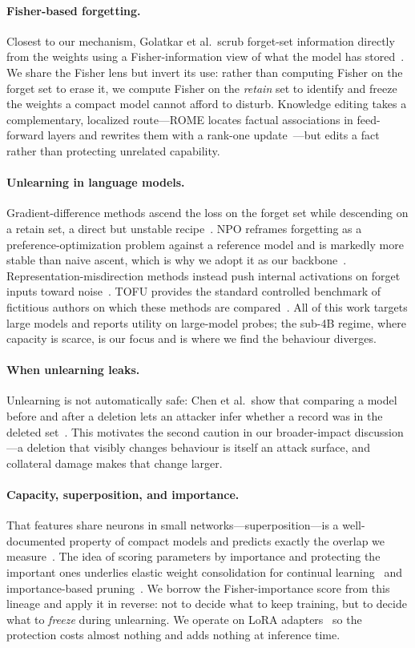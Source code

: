 \documentclass[sigconf,nonacm]{acmart}
\begin{document}
\paragraph{Fisher-based forgetting.}
Closest to our mechanism, Golatkar et al.\ scrub forget-set information directly from the weights using a Fisher-information view of what the model has stored~\cite{golatkar}. We share the Fisher lens but invert its use: rather than computing Fisher on the forget set to erase it, we compute Fisher on the \emph{retain} set to identify and freeze the weights a compact model cannot afford to disturb. Knowledge editing takes a complementary, localized route---ROME locates factual associations in feed-forward layers and rewrites them with a rank-one update~\cite{rome}---but edits a fact rather than protecting unrelated capability.

\paragraph{Unlearning in language models.}
Gradient-difference methods ascend the loss on the forget set while descending on a retain set, a direct but unstable recipe~\cite{yao2023}. NPO reframes forgetting as a preference-optimization problem against a reference model and is markedly more stable than naive ascent, which is why we adopt it as our backbone~\cite{npo}. Representation-misdirection methods instead push internal activations on forget inputs toward noise~\cite{wmdp}. TOFU provides the standard controlled benchmark of fictitious authors on which these methods are compared~\cite{tofu}. All of this work targets large models and reports utility on large-model probes; the sub-4B regime, where capacity is scarce, is our focus and is where we find the behaviour diverges.

\paragraph{When unlearning leaks.}
Unlearning is not automatically safe: Chen et al.\ show that comparing a model before and after a deletion lets an attacker infer whether a record was in the deleted set~\cite{chen2021}. This motivates the second caution in our broader-impact discussion---a deletion that visibly changes behaviour is itself an attack surface, and collateral damage makes that change larger.

\paragraph{Capacity, superposition, and importance.}
That features share neurons in small networks---superposition---is a well-documented property of compact models and predicts exactly the overlap we measure~\cite{superposition}. The idea of scoring parameters by importance and protecting the important ones underlies elastic weight consolidation for continual learning~\cite{ewc} and importance-based pruning~\cite{wanda}. We borrow the Fisher-importance score from this lineage and apply it in reverse: not to decide what to keep training, but to decide what to \emph{freeze} during unlearning. We operate on LoRA adapters~\cite{lora} so the protection costs almost nothing and adds nothing at inference time.
\end{document}
